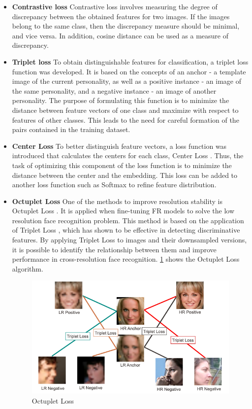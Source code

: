 \documentclass[11pt,a4paper]{article}
\begin{document}
\begin{itemize}
\item{\bf{Contrastive loss}}
Contrastive loss \cite{contrastiveLoss} involves measuring the degree of discrepancy between the obtained features for two images. If the images belong to the same class, then the discrepancy measure should be minimal, and vice versa. In addition, cosine distance can be used as a measure of discrepancy.
\item{\bf{Triplet loss}}
To obtain distinguishable features for classification, a triplet loss \cite{tripletLoss} function was developed. It is based on the concepts of an anchor -  a template image of the current personality, as well as a positive instance -  an image of the same personality, and a negative instance - an image of another personality. The purpose of formulating this function is to minimize the distance between feature vectors of one class and maximize with respect to features of other classes. This leads to the need for careful formation of the pairs contained in the training dataset.
\item{\bf{Center Loss}}
To better distinguish feature vectors, a loss function was introduced that calculates the centers for each class, Center Loss \cite{centerLoss}. Thus, the task of optimizing this component of the loss function is to minimize the distance between the center and the embedding. This loss can be added to another loss function such as Softmax \cite{softmax} to refine feature distribution.
\item{\bf{Octuplet Loss}}
One of the methods to improve resolution stability is Octuplet Loss \cite{26}. It is applied when fine-tuning FR models to solve the low resolution face recognition problem. This method is based on the application of Triplet Loss \cite{tripletLoss}, which has shown to be effective in detecting discriminative features. By applying Triplet Loss to images and their downsampled versions, it is possible to identify the relationship between them and improve performance in cross-resolution face recognition. \ref{fig:octuplet}  shows the Octuplet Loss \cite{26} algorithm.

\begin{figure}[ht!]
    \centering
    \includegraphics[width=\textwidth]{octuplet.png}
    \caption{Octuplet Loss}
    \label{fig:octuplet}
\end{figure}


\end{itemize}
\end{document}
